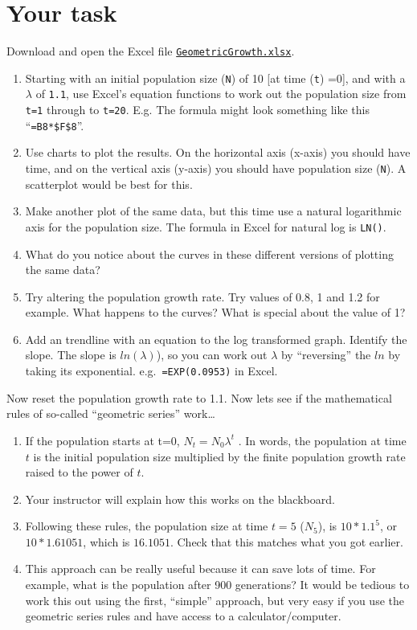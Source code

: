 \documentclass[
  a4paper]{book}
\providecommand{\tightlist}{%
  \setlength{\itemsep}{0pt}\setlength{\parskip}{0pt}}
\begin{document}
\section{Your task}\label{your-task-2}

Download and open the Excel file \href{https://www.dropbox.com/s/xxx05sckvop5i52/GeometricGrowth.xlsx?dl=1}{\texttt{GeometricGrowth.xlsx}}.

\begin{enumerate}
\def\labelenumi{\arabic{enumi}.}
\tightlist
\item
  Starting with an initial population size (\texttt{N}) of 10 {[}at time (\texttt{t}) =0{]}, and with a \(\lambda\) of \texttt{1.1}, use Excel's equation functions to work out the population size from \texttt{t=1} through to \texttt{t=20}. E.g. The formula might look something like this ``\texttt{=B8*\$F\$8}''.
\item
  Use charts to plot the results. On the horizontal axis (x-axis) you should have time, and on the vertical axis (y-axis) you should have population size (\texttt{N}). A scatterplot would be best for this.
\item
  Make another plot of the same data, but this time use a natural logarithmic axis for the population size. The formula in Excel for natural log is \texttt{LN()}.
\item
  What do you notice about the curves in these different versions of plotting the same data?
\item
  Try altering the population growth rate. Try values of 0.8, 1 and 1.2 for example. What happens to the curves? What is special about the value of 1?
\item
  Add an trendline with an equation to the log transformed graph. Identify the slope. The slope is \(ln(\lambda)\)), so you can work out \(\lambda\) by ``reversing'' the \(ln\) by taking its exponential. e.g.~\texttt{=EXP(0.0953)} in Excel.
\end{enumerate}

Now reset the population growth rate to 1.1. Now lets see if the mathematical rules of so-called ``geometric series'' work\ldots{}

\begin{enumerate}
\def\labelenumi{\arabic{enumi}.}
\tightlist
\item
  If the population starts at t=0, \(N_t = N_0 \lambda^t\) . In words, the population at time \(t\) is the initial population size multiplied by the finite population growth rate raised to the power of \(t\).
\item
  Your instructor will explain how this works on the blackboard.
\item
  Following these rules, the population size at time \(t=5\) (\(N_5\)), is \(10 * 1.1^5\), or \(10* 1.61051\), which is \(16.1051\). Check that this matches what you got earlier.
\item
  This approach can be really useful because it can save lots of time. For example, what is the population after 900 generations? It would be tedious to work this out using the first, ``simple'' approach, but very easy if you use the geometric series rules and have access to a calculator/computer.
\end{enumerate}
\end{document}

